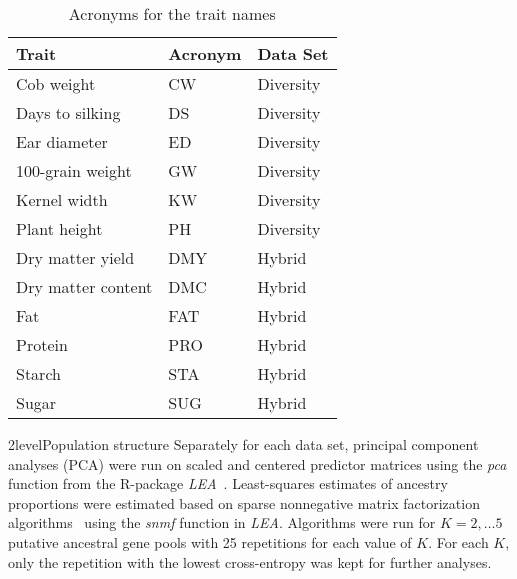 \documentclass[12pt,titlepage]{article}
\begin{document}
\begin{table}[]
\centering
\caption{Acronyms for the trait names}
\label{table:TraitKey}
\begin{tabular}{@{}lll@{}}
\toprule
Trait              & Acronym & Data Set  \\ \midrule
Cob weight         & CW      & Diversity \\
Days to silking    & DS      & Diversity \\
Ear diameter       & ED      & Diversity \\
100-grain weight   & GW      & Diversity \\
Kernel width       & KW      & Diversity \\
Plant height       & PH      & Diversity \\
Dry matter yield   & DMY     & Hybrid    \\
Dry matter content & DMC     & Hybrid    \\
Fat                & FAT     & Hybrid    \\
Protein            & PRO     & Hybrid    \\
Starch             & STA     & Hybrid    \\
Sugar              & SUG     & Hybrid    \\ \bottomrule
\end{tabular}
\end{table}

\Genetics2level{Population structure}
Separately for each data set, principal component analyses (PCA) were run on 
scaled and centered predictor matrices using the \emph{pca} function from the 
R-package \textit{LEA}~\cite{Frichot2015}.
Least-squares estimates of ancestry proportions were estimated based on sparse 
nonnegative matrix factorization algorithms~\cite{Frichot2014} using the 
\emph{snmf} function in \textit{LEA}.
Algorithms were run for $K=2, \dots 5$ putative ancestral gene pools with 25
repetitions for each value of $K$. 
For each $K$, only the repetition with the lowest cross-entropy was kept for 
further analyses.
\end{document}
